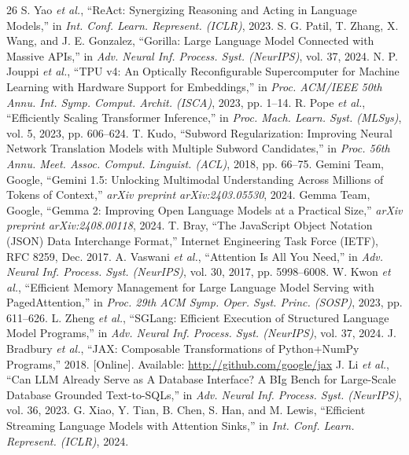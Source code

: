 \documentclass[conference,10pt]{IEEEtran}
\begin{document}
\begin{thebibliography}{26}
 S. Yao \emph{et al.}, ``ReAct: Synergizing Reasoning and Acting in Language Models,'' in \emph{Int. Conf. Learn. Represent. (ICLR)}, 2023.
 S. G. Patil, T. Zhang, X. Wang, and J. E. Gonzalez, ``Gorilla: Large Language Model Connected with Massive APIs,'' in \emph{Adv. Neural Inf. Process. Syst. (NeurIPS)}, vol. 37, 2024.
 N. P. Jouppi \emph{et al.}, ``TPU v4: An Optically Reconfigurable Supercomputer for Machine Learning with Hardware Support for Embeddings,'' in \emph{Proc. ACM/IEEE 50th Annu. Int. Symp. Comput. Archit. (ISCA)}, 2023, pp. 1--14.
 R. Pope \emph{et al.}, ``Efficiently Scaling Transformer Inference,'' in \emph{Proc. Mach. Learn. Syst. (MLSys)}, vol. 5, 2023, pp. 606--624.
 T. Kudo, ``Subword Regularization: Improving Neural Network Translation Models with Multiple Subword Candidates,'' in \emph{Proc. 56th Annu. Meet. Assoc. Comput. Linguist. (ACL)}, 2018, pp. 66--75.
 Gemini Team, Google, ``Gemini 1.5: Unlocking Multimodal Understanding Across Millions of Tokens of Context,'' \emph{arXiv preprint arXiv:2403.05530}, 2024.
 Gemma Team, Google, ``Gemma 2: Improving Open Language Models at a Practical Size,'' \emph{arXiv preprint arXiv:2408.00118}, 2024.
 T. Bray, ``The JavaScript Object Notation (JSON) Data Interchange Format,'' Internet Engineering Task Force (IETF), RFC 8259, Dec. 2017.
 A. Vaswani \emph{et al.}, ``Attention Is All You Need,'' in \emph{Adv. Neural Inf. Process. Syst. (NeurIPS)}, vol. 30, 2017, pp. 5998--6008.
 W. Kwon \emph{et al.}, ``Efficient Memory Management for Large Language Model Serving with PagedAttention,'' in \emph{Proc. 29th ACM Symp. Oper. Syst. Princ. (SOSP)}, 2023, pp. 611--626.
 L. Zheng \emph{et al.}, ``SGLang: Efficient Execution of Structured Language Model Programs,'' in \emph{Adv. Neural Inf. Process. Syst. (NeurIPS)}, vol. 37, 2024.
 J. Bradbury \emph{et al.}, ``JAX: Composable Transformations of Python+NumPy Programs,'' 2018. [Online]. Available: \url{http://github.com/google/jax}
 J. Li \emph{et al.}, ``Can LLM Already Serve as A Database Interface? A BIg Bench for Large-Scale Database Grounded Text-to-SQLs,'' in \emph{Adv. Neural Inf. Process. Syst. (NeurIPS)}, vol. 36, 2023.
 G. Xiao, Y. Tian, B. Chen, S. Han, and M. Lewis, ``Efficient Streaming Language Models with Attention Sinks,'' in \emph{Int. Conf. Learn. Represent. (ICLR)}, 2024.

\end{thebibliography}
\end{document}
